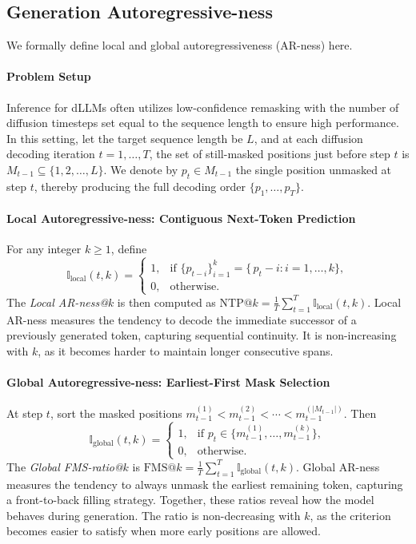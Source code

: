 \subsection{Generation Autoregressive-ness}
\label{appx:Causality}
We formally define local and global autoregressiveness (AR-ness) here.
\paragraph{Problem Setup}
Inference for dLLMs often utilizes low-confidence remasking with the number of diffusion timesteps set equal to the sequence length to ensure high performance.
In this setting, let the target sequence length be \(L\), and at each diffusion decoding iteration \(t=1,\dots,T\), the set of still-masked positions just before step \(t\) is
$M_{t-1}\subseteq\{1,2,\dots,L\}$.
We denote by \(p_t\in M_{t-1}\) the single position unmasked at step \(t\), thereby producing the full decoding order \(\{p_1,\dots,p_T\}\).

\paragraph{Local Autoregressive-ness: Contiguous Next-Token Prediction}
For any integer \(k\ge1\), define
\[
\mathbb{I}_{\mathrm{local}}(t,k)
=
\begin{cases}
1,&\text{if }\{p_{t-i}\}_{i=1}^k=\{\,p_t-i : i=1,\dots,k\},\\
0,&\text{otherwise.}
\end{cases}
\]
The \emph{Local AR-ness@\(k\)} is then computed as
$\mathrm{NTP@}k=\frac{1}{T}\sum_{t=1}^{T}\mathbb{I}_{\mathrm{local}}(t,k)$. Local AR-ness measures the tendency to decode the immediate successor of a previously generated token, capturing sequential continuity. It is non-increasing with \(k\), as it becomes harder to maintain longer consecutive spans.

\paragraph{Global Autoregressive-ness: Earliest-First Mask Selection}
At step \(t\), sort the masked positions $m_{t-1}^{(1)}<m_{t-1}^{(2)}<\cdots<m_{t-1}^{(|M_{t-1}|)}$.
Then
\[
\mathbb{I}_{\mathrm{global}}(t,k)
=
\begin{cases}
1,&\text{if }p_t\in\{m_{t-1}^{(1)},\dots,m_{t-1}^{(k)}\},\\
0,&\text{otherwise.}
\end{cases}
\]
The \emph{Global FMS-ratio@\(k\)} is
$\mathrm{FMS@}k=\frac{1}{T}\sum_{t=1}^{T}\mathbb{I}_{\mathrm{global}}(t,k)$. Global AR-ness measures the tendency to always unmask the earliest remaining token, capturing a front-to-back filling strategy. Together, these ratios reveal how the model behaves during generation. The ratio is non-decreasing with \(k\), as the criterion becomes easier to satisfy when more early positions are allowed.

